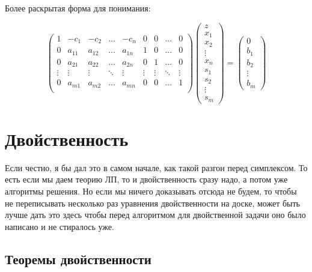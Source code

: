 \documentclass[a4paper,article,14pt]{extarticle}
\begin{document}
Более раскрытая форма для понимания:

\begin{equation}
    \begin{pmatrix}
        1 & -c_1 & -c_2 & \ldots & -c_n & 0 & 0 & \ldots & 0 \\
        0 & a_{11} & a_{12} & \ldots & a_{1n} & 1 & 0 & \ldots & 0 \\
        0 & a_{21} & a_{22} & \ldots & a_{2n} & 0 & 1 & \ldots & 0 \\
        \vdots & \vdots & \vdots & \ddots & \vdots & \vdots & \vdots & \ddots & \vdots \\
        0 & a_{m1} & a_{m2} & \ldots & a_{mn} & 0 & 0 & \ldots & 1 \\
    \end{pmatrix}
    \begin{pmatrix}
        z \\ x_1 \\ x_2 \\ \vdots \\ x_n \\ s_1 \\ s_2 \\ \vdots \\ s_m
    \end{pmatrix}
    =
    \begin{pmatrix}
        0 \\ b_1 \\ b_2 \\ \vdots \\ b_m
    \end{pmatrix}
\end{equation}

\section{Двойственность}

Если честно, я бы дал это в самом начале, как такой разгон перед симплексом.
То есть если мы даем теорию ЛП, то и двойственность сразу надо, а потом уже алгоритмы решения.
Но если мы ничего доказывать отсюда не будем, то чтобы не переписывать несколько раз уравнения двойственности на доске, может быть лучше дать это здесь чтобы перед алгоритмом для двойственной задачи оно было написано и не стиралось уже.

\subsection{Теоремы двойственности}
\end{document}
